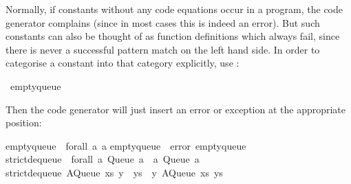 \begin{isabellebody}
\begin{isamarkuptext}
  Normally, if constants without any code equations occur in a
  program, the code generator complains (since in most cases this is
  indeed an error).  But such constants can also be thought
  of as function definitions which always fail,
  since there is never a successful pattern match on the left hand
  side.  In order to categorise a constant into that category
  explicitly, use \hypertarget{command.code-abort}{\hyperlink{command.code-abort}{\mbox{}}}:%
\end{isamarkuptext}%
\isamarkuptrue%
%
\isadelimquote
%
\endisadelimquote
%
\isatagquote
{}\isamarkupfalse%
\ empty{}queue%
\endisatagquote
{\isafoldquote}%
%
\isadelimquote
%
\endisadelimquote
%
\begin{isamarkuptext}%
\noindent Then the code generator will just insert an error or
  exception at the appropriate position:%
\end{isamarkuptext}%
\isamarkuptrue%
%
\isadelimquotetypewriter
%
\endisadelimquotetypewriter
%
\isatagquotetypewriter
%
\begin{isamarkuptext}%
empty{}queue\ {}{}\ forall\ a{}\ a{}\isanewline
empty{}queue\ {}\ error\ {}empty{}queue{}{}\isanewline
\isanewline
strict{}dequeue\ {}{}\ forall\ a{}\ Queue\ a\ {}{}\ {}a{}\ Queue\ a{}{}\isanewline
strict{}dequeue\ {}AQueue\ xs\ {}y\ {}\ ys{}{}\ {}\ {}y{}\ AQueue\ xs\ ys{}{}\isanewline

\end{isamarkuptext}
\end{isabellebody}
